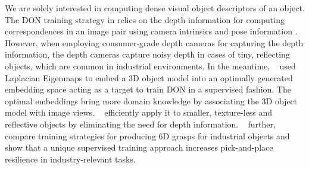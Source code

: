 We are solely interested in computing dense visual object descriptors of an object.
The DON training strategy in \cite{florence2018dense} relies on the depth information for computing correspondences in an image pair using
camera intrinsics and pose information \cite{hartley2003multiple}.
However, when employing consumer-grade depth cameras for capturing the depth information,
the depth cameras capture noisy depth in cases of tiny, reflecting objects, which are common in
industrial environments. In the meantime, \citeauthor{kupcsik2021supervised}~\cite{kupcsik2021supervised} used Laplacian Eigenmaps \cite{belkin2003laplacian}
to embed a 3D object model into an optimally generated embedding space acting as a target to train DON in a supervised fashion.
The optimal embeddings bring more domain knowledge by associating the 3D object model with image views.
\citeauthor{kupcsik2021supervised}~\cite{kupcsik2021supervised} efficiently apply it to smaller, texture-less and
reflective objects by eliminating the need for depth information. \citeauthor{kupcsik2021supervised}~\cite{kupcsik2021supervised}
further, compare training strategies for producing 6D grasps for industrial objects and show that a unique supervised training approach
increases pick-and-place resilience in industry-relevant tasks.

